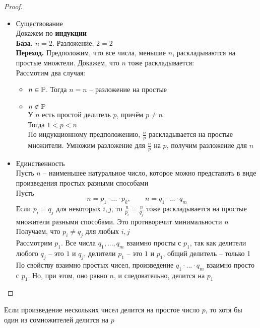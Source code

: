 \begin{proof}
	\hfill
	\begin{itemize}
		\item Существование \\
		Докажем по \textbf{индукции} \\
		\textbf{База.} $n = 2$. Разложение: $ 2 = 2 $ \\
		\textbf{Переход.} Предположим, что все числа, меньшие $n$, раскладываются на простые множтели. Докажем, что $n$ тоже раскладывается: \\
		Рассмотим два случая:
		\begin{itemize}
			\item $n \in \mathbb{P}$. Тогда $n = n$ -- разложение на простые
			\item $n \notin \mathbb{P}$ \\
			У $n$ есть простой делитель $p$, причём $p \ne n$ \\
			Тогда $1 < p < n$ \\
			По индукционному предположению, $\frac{n}p$ раскладывается на простые множители. Умножим разложение для $\frac{n}p$ на $p$, получим разложение для $n$
		\end{itemize}
		\item Единственность \\
		Пусть $n$ -- наименьшее натуральное число, которое можно представить в виде произведения простых разными способами \\
		Пусть
		$$ n = p_1 \cdot ... \cdot p_k, \qquad n = q_1 \cdot ... \cdot q_m $$
		Если $p_i = q_j$ для некоторых $i, j$, то $\frac{n}{p_i} = \frac{n}{q_j}$ тоже раскладывается на простые множители разными способами. Это противоречит минимальности $n$ \\
		Получаем, что $p_i \ne q_j$ для любых $i, j$ \\
		Рассмотрим $p_1$. Все числа $q_1, ..., q_m$ взаимно просты с $p_1$, так как делители любого $q_j$ -- это $1$ и $q_j$, делители $p_1$ -- это $1$ и $p_1$, общий делитель -- только 1 \\
		По свойству взаимно простых чисел, произведение $q_1 \cdot ... \cdot q_m$ взаимно просто с $p_1$. Но, при этом, оно равно $n$, и следовательно, делится на $p_1$
	\end{itemize}
\end{proof}

\begin{implication}
	Если произведение нескольких чисел делится на простое число $p$, то хотя бы один из сомножителей делится на $p$
\end{implication}

